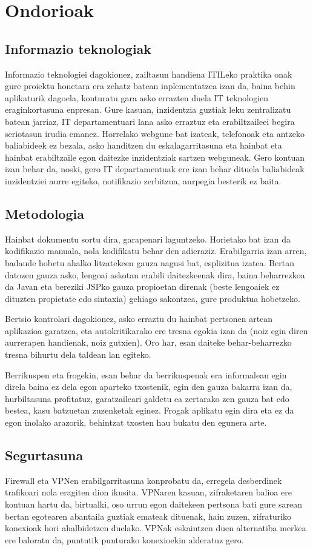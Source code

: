 \section{Ondorioak}
\subsection{Informazio teknologiak}
Informazio teknologiei dagokionez, zailtasun handiena ITILeko praktika onak gure proiektu honetara era zehatz batean inplementatzea izan da, baina behin aplikaturik dagoela, konturatu gara asko errazten duela IT teknologien eraginkortasuna enpresan. Gure kasuan, inzidentzia guztiak leku zentralizatu batean jarriaz, IT departamentuari lana asko erraztuz eta erabiltzaileei begira seriotasun irudia emanez. Horrelako webgune bat izateak, telefonoak eta antzeko baliabideek ez bezala, asko handitzen du eskalagarritasuna eta hainbat eta hainbat erabiltzaile egon daitezke inzidentziak sartzen webguneak. Gero kontuan izan behar da, noski, gero IT departamentuak ere izan behar dituela baliabideak inzidentziei aurre egiteko, notifikazio zerbitzua, aurpegia besterik ez baita.


\subsection{Metodologia}
Hainbat dokumentu sortu dira, garapenari laguntzeko. Horietako bat izan da kodifikazio manuala, nola kodifikatu behar den adieraziz. Erabilgarria izan arren, badaude hobetu ahalko litzatekeen gauza nagusi bat, esplizitua izatea. Bertan datozen gauza asko, lengoai askotan erabili daitezkeenak dira, baina beharrezkoa da Javan eta bereziki JSPko gauza propioetan direnak (beste lengoaiek ez dituzten propietate edo sintaxia) gehiago sakontzea, gure produktua hobetzeko.

Bertsio kontrolari dagokionez, asko erraztu du hainbat pertsonen artean aplikazioa garatzea, eta autokritikarako ere tresna egokia izan da (noiz egin diren aurrerapen handienak, noiz gutxien). Oro har, esan daiteke behar-beharrezko tresna bihurtu dela taldean lan egiteko.

Berrikuspen eta frogekin, esan behar da berrikuspenak era informalean egin direla baina ez dela egon aparteko txostenik, egin den gauza bakarra izan da, hurbiltasuna profitatuz, garatzaileari galdetu ea zertarako zen gauza bat edo bestea, kasu batzuetan zuzenketak eginez. Frogak aplikatu egin dira eta ez da egon inolako arazorik, behintzat txosten hau bukatu den egunera arte.

\subsection{Segurtasuna}
Firewall eta VPNen erabilgarritasuna konprobatu da, erregela desberdinek trafikoari nola eragiten dion ikusita. VPNaren kasuan, zifraketaren balioa ere kontuan hartu da, birtualki, oso urrun egon daitekeen pertsona bati gure sarean bertan egotearen abantaila guztiak emateak dituenak, hain zuzen, zifraturiko konexioak hori ahalbidetzen duelako. VPNak eskaintzen duen alternatiba merkea ere baloratu da, puntutik punturako konexioekin alderatuz gero.
